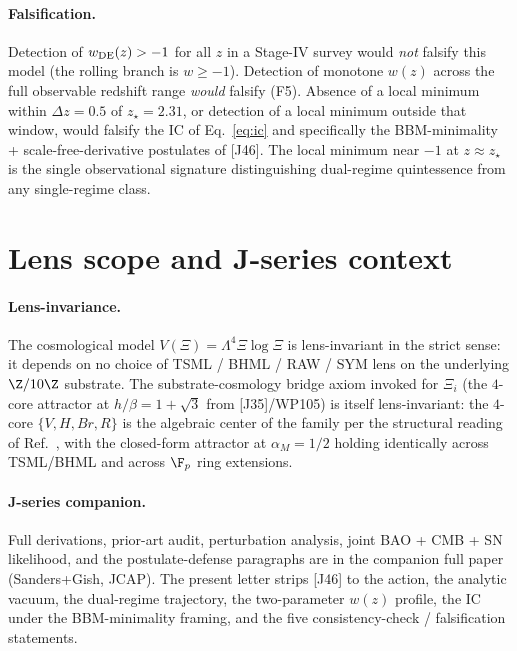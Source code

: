 \documentclass[aps,prl,reprint,floatfix,nofootinbib]{revtex4-2}
\newcommand{\Xii}{\Xi_i}
\newcommand{\zstar}{z_\star}
\newcommand{\wDE}{w_{\rm DE}}
\begin{document}
\paragraph*{Falsification.}
Detection of $\wDE(z) > -1$ for all $z$ in a Stage-IV survey
would \emph{not} falsify this model (the rolling branch is
$w \ge -1$). Detection of monotone $w(z)$ across the full
observable redshift range \emph{would} falsify (F5). Absence
of a local minimum within $\Delta z = 0.5$ of
$\zstar = 2.31$, or detection of a local minimum outside that
window, would falsify the IC of Eq.~\eqref{eq:ic} and
specifically the BBM-minimality + scale-free-derivative
postulates of [J46]. The local minimum near $-1$ at
$z \approx \zstar$ is the single observational signature
distinguishing dual-regime quintessence from any single-regime
class.

\section{Lens scope and J-series context}\label{sec:lens}

\paragraph*{Lens-invariance.}
The cosmological model
$V(\Xi) = \Lambda^4 \Xi\log\Xi$ is lens-invariant in the strict
sense: it depends on no choice of TSML / BHML / RAW / SYM
lens on the underlying $\Z/10\Z$ substrate. The
substrate-cosmology bridge axiom invoked for $\Xii$ (the
$4$-core attractor at $h/\beta = 1+\sqrt{3}$ from
[J35]/WP105) is itself lens-invariant: the $4$-core
$\{V, H, Br, R\}$ is the algebraic center of the family per
the structural reading of Ref.~\cite{FamilyStructure2026},
with the closed-form attractor at $\alpha_M = 1/2$ holding
identically across TSML/BHML and across $\F_p$ ring
extensions.

\paragraph*{J-series companion.}
Full derivations, prior-art audit, perturbation analysis,
joint BAO + CMB + SN likelihood, and the postulate-defense
paragraphs are in the companion full paper~\cite{J46}
(Sanders+Gish, JCAP). The present letter strips [J46] to
the action, the analytic vacuum, the dual-regime trajectory,
the two-parameter $w(z)$ profile, the IC under the
BBM-minimality framing, and the five consistency-check /
falsification statements.
\end{document}
